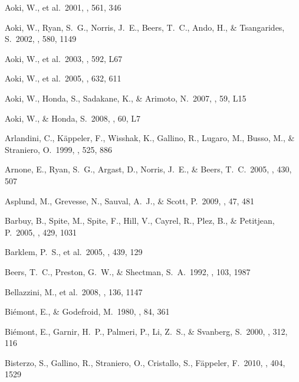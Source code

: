 \documentclass{emulateapj}
\begin{document}
\begin{thebibliography}{}


 Aoki, W., et al.\ 2001, 
\apj, 561, 346 

 Aoki, W., Ryan, S.~G., 
Norris, J.~E., Beers, T.~C., Ando, H., 
\& Tsangarides, S.\ 2002, \apj, 580, 1149 

 Aoki, W., et al.\ 2003, \apjl, 592, L67 

 Aoki, W., et al.\ 2005, 
\apj, 632, 611 

 Aoki, W., Honda, S., 
Sadakane, K., \& Arimoto, N.\ 2007, \pasj, 59, L15 

 Aoki, W., \& Honda, S.\ 2008, 
\pasj, 60, L7 

 Arlandini, C., 
K{\"a}ppeler, F., Wisshak, K., Gallino, R., Lugaro, M., Busso, M., 
\& Straniero, O.\ 1999, \apj, 525, 886 

 Arnone, E., Ryan, S.~G., 
Argast, D., Norris, J.~E., \& Beers, T.~C.\ 2005, \aap, 430, 507 

 Asplund, M., Grevesse, N., 
Sauval, A.~J., \& Scott, P.\ 2009, \araa, 47, 481 

 Barbuy, B., Spite, M., Spite, F., 
Hill, V., Cayrel, R., Plez, B., \& Petitjean, P.\ 2005, \aap, 429, 1031 

 Barklem, P.~S., et al.\ 2005, 
\aap, 439, 129 

 Beers, T.~C., Preston, 
G.~W., \& Shectman, S.~A.\ 1992, \aj, 103, 1987

 Bellazzini, M., et 
al.\ 2008, \aj, 136, 1147 

 Bi{\'e}mont, E., \& 
Godefroid, M.\ 1980, \aap, 84, 361 

 Bi{\'e}mont, E., 
Garnir, H.~P., Palmeri, P., Li, Z.~S., 
\& Svanberg, S.\ 2000, \mnras, 312, 116 

 Bisterzo, S., Gallino, 
R., Straniero, O., Cristallo, S., F\"{a}ppeler, F.\ 2010, \mnras, 404, 1529


\end{thebibliography}
\end{document}
